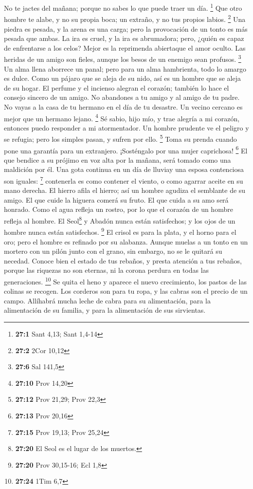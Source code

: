  No te jactes del mañana; porque no sabes lo que puede
traer un día. \footnote{\textbf{27:1} Sant 4,13; Sant 1,4-14}
 Que otro hombre te alabe, y no su propia boca; un
extraño, y no tus propios labios. \footnote{\textbf{27:2} 2Cor 10,12}
 Una piedra es pesada, y la arena es una carga; pero la
provocación de un tonto es más pesada que ambas.  La ira
es cruel, y la ira es abrumadora; pero, ¿quién es capaz de enfrentarse a
los celos?  Mejor es la reprimenda abiertaque el amor
oculto.  Las heridas de un amigo son fieles, aunque los
besos de un enemigo sean profusos. \footnote{\textbf{27:6} Sal 141,5}
 Un alma llena aborrece un panal; pero para un alma
hambrienta, todo lo amargo es dulce.  Como un pájaro que
se aleja de su nido, así es un hombre que se aleja de su hogar.
 El perfume y el incienso alegran el corazón; también lo
hace el consejo sincero de un amigo.  No abandones a tu
amigo y al amigo de tu padre. No vayas a la casa de tu hermano en el día
de tu desastre. Un vecino cercano es mejor que un hermano lejano.
\footnote{\textbf{27:10} Prov 14,20}  Sé sabio, hijo mío,
y trae alegría a mi corazón, entonces puedo responder a mi atormentador.
 Un hombre prudente ve el peligro y se refugia; pero los
simples pasan, y sufren por ello. \footnote{\textbf{27:12} Prov 21,29;
  Prov 22,3}  Toma su prenda cuando pone una garantía
para un extranjero. ¡Sosténgalo por una mujer caprichosa! \footnote{\textbf{27:13}
  Prov 20,16}  El que bendice a su prójimo en voz alta
por la mañana, será tomado como una maldición por él. 
Una gota continua en un día de lluviay una esposa contenciosa son
iguales: \footnote{\textbf{27:15} Prov 19,13; Prov 25,24}
 contenerla es como contener el viento, o como agarrar
aceite en su mano derecha.  El hierro afila el hierro;
así un hombre agudiza el semblante de su amigo.  El que
cuide la higuera comerá su fruto. El que cuida a su amo será honrado.
 Como el agua refleja un rostro, por lo que el corazón de
un hombre refleja al hombre.  El Seol\footnote{\textbf{27:20}
  El Seol es el lugar de los muertos.} y Abadón nunca están satisfechos;
y los ojos de un hombre nunca están satisfechos. \footnote{\textbf{27:20}
  Prov 30,15-16; Ecl 1,8}  El crisol es para la plata, y
el horno para el oro; pero el hombre es refinado por su alabanza.
 Aunque muelas a un tonto en un mortero con un pilón
junto con el grano, sin embargo, no se le quitará su necedad.
 Conoce bien el estado de tus rebaños, y presta atención
a tus rebaños,  porque las riquezas no son eternas, ni la
corona perdura en todas las generaciones. \footnote{\textbf{27:24} 1Tim
  6,7}  Se quita el heno y aparece el nuevo crecimiento,
los pastos de las colinas se recogen.  Los corderos son
para tu ropa, y las cabras son el precio de un campo. 
Allíhabrá mucha leche de cabra para su alimentación, para la
alimentación de su familia, y para la alimentación de sus sirvientas.

